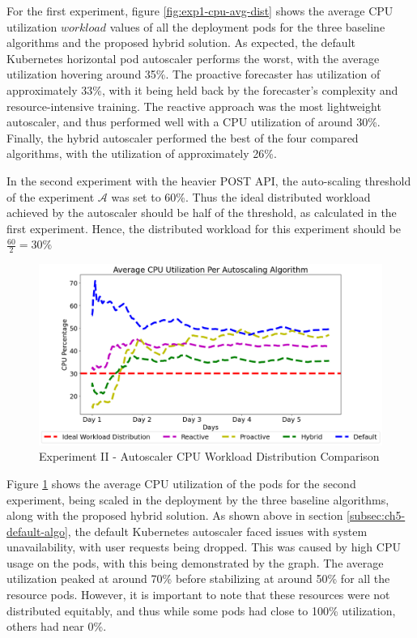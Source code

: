 For the first experiment, figure \ref{fig:exp1-cpu-avg-dist} shows the average CPU utilization $workload$ values of all the deployment pods for the three baseline algorithms and the proposed hybrid solution. As expected, the default Kubernetes horizontal pod autoscaler performs the worst, with the average utilization hovering around 35\%. The proactive forecaster has utilization of approximately 33\%, with it being held back by the forecaster's complexity and resource-intensive training. The reactive approach was the most lightweight autoscaler, and thus performed well with a CPU utilization of around 30\%. Finally, the hybrid autoscaler performed the best of the four compared algorithms, with the utilization of approximately 26\%.\par

In the second experiment with the heavier POST API, the auto-scaling threshold of the experiment $\mathcal{A}$ was set to 60\%. Thus the ideal distributed workload achieved by the autoscaler should be half of the threshold, as calculated in the first experiment. Hence, the distributed workload for this experiment should be $\frac{60}{2} = 30\%$

\begin{figure}[htb]
    \centering
    \caption{Experiment II - Autoscaler CPU Workload Distribution Comparison}
    \label{fig:exp2-cpu-avg-dist}
    \includegraphics[width=0.6\linewidth]{Figures/Compose-Post-CPU-Usage.png}
\end{figure}

Figure \ref{fig:exp2-cpu-avg-dist} shows the average CPU utilization of the pods for the second experiment, being scaled in the deployment by the three baseline algorithms, along with the proposed hybrid solution. As shown above in section \ref{subsec:ch5-default-algo}, the default Kubernetes autoscaler faced issues with system unavailability, with user requests being dropped. This was caused by high CPU usage on the pods, with this being demonstrated by the graph. The average utilization peaked at around 70\% before stabilizing at around 50\% for all the resource pods. However, it is important to note that these resources were not distributed equitably, and thus while some pods had close to 100\% utilization, others had near 0\%.\par

